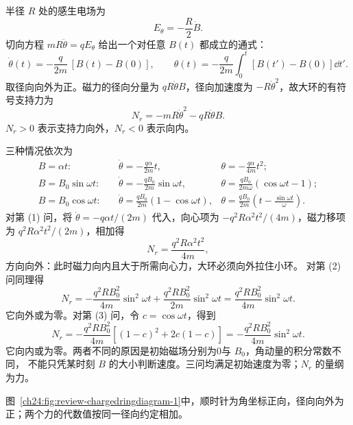 \begin{xesolution}
半径 $R$ 处的感生电场为
\begin{equation}
  E_\theta=-\frac R2\dot B.
\end{equation}
切向方程 $mR\ddot\theta=qE_\theta$ 给出一个对任意 $B(t)$ 都成立的通式：
\begin{equation}
  \boxed{\dot\theta(t)=-\frac q{2m}\,[B(t)-B(0)]},
  \qquad
  \boxed{\theta(t)=-\frac q{2m}\int_0^t[B(t')-B(0)]\dd t'}.
\end{equation}
取径向向外为正。磁力的径向分量为 $qR\dot\theta B$，径向加速度为 $-R\dot\theta^2$，故大环的有符号支持力为
\begin{equation}
  \boxed{N_r=-mR\dot\theta^2-qR\dot\theta B}.
\end{equation}
$N_r>0$ 表示支持力向外，$N_r<0$ 表示向内。

三种情况依次为
\begin{align}
  B=\alpha t:\quad
  &\boxed{\dot\theta=-\frac{q\alpha}{2m}t},
  &\boxed{\theta=-\frac{q\alpha}{4m}t^2};\\
  B=B_0\sin\omega t:\quad
  &\boxed{\dot\theta=-\frac{qB_0}{2m}\sin\omega t},
  &\boxed{\theta=\frac{qB_0}{2m\omega}(\cos\omega t-1)};\\
  B=B_0\cos\omega t:\quad
  &\boxed{\dot\theta=\frac{qB_0}{2m}(1-\cos\omega t)},
  &\boxed{\theta=\frac{qB_0}{2m}\left(t-\frac{\sin\omega t}{\omega}\right)}.
\end{align}
对第 (1) 问，将 $\dot\theta=-q\alpha t/(2m)$ 代入，向心项为
$-q^2R\alpha^2t^2/(4m)$，磁力移项为 $q^2R\alpha^2t^2/(2m)$，相加得
\begin{equation}
  \boxed{N_r=\frac{q^2R\alpha^2t^2}{4m}},
\end{equation}
方向向外：此时磁力向内且大于所需向心力，大环必须向外拉住小环。
对第 (2) 问同理得
\[
 N_r=-\frac{q^2RB_0^2}{4m}\sin^2\omega t
      +\frac{q^2RB_0^2}{2m}\sin^2\omega t
 =\boxed{\frac{q^2RB_0^2}{4m}\sin^2\omega t}.
\]
它向外或为零。对第 (3) 问，令 $c=\cos\omega t$，得到
\[
 N_r=-\frac{q^2RB_0^2}{4m}[(1-c)^2+2c(1-c)]
 =\boxed{-\frac{q^2RB_0^2}{4m}\sin^2\omega t}.
\]
它向内或为零。两者不同的原因是初始磁场分别为0与 $B_0$，角动量的积分常数不同，
不能只凭某时刻 $B$ 的大小判断速度。三问均满足初始速度为零；$N_r$ 的量纲为力。

图~\ref{ch24:fig:review-chargedringdiagram-1}中，顺时针为角坐标正向，径向向外为正；两个力的代数值按同一径向约定相加。

\end{xesolution}
